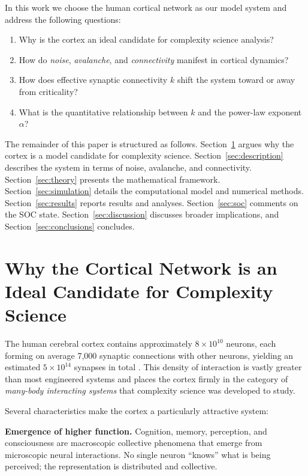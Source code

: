 \documentclass[12pt,a4paper]{article}
\begin{document}
In this work we choose the human cortical network as our model system
and address the following questions:
\begin{enumerate}[noitemsep]
  \item Why is the cortex an ideal candidate for complexity science analysis?
  \item How do \emph{noise}, \emph{avalanche}, and \emph{connectivity}
        manifest in cortical dynamics?
  \item How does effective synaptic connectivity $k$ shift the system
        toward or away from criticality?
  \item What is the quantitative relationship between $k$ and the
        power-law exponent $\alpha$?
\end{enumerate}

The remainder of this paper is structured as follows.
Section~\ref{sec:candidate} argues why the cortex is a model candidate
for complexity science.  Section~\ref{sec:description} describes the
system in terms of noise, avalanche, and connectivity.
Section~\ref{sec:theory} presents the mathematical framework.
Section~\ref{sec:simulation} details the computational model and
numerical methods.  Section~\ref{sec:results} reports results and
analyses.  Section~\ref{sec:soc} comments on the SOC state.
Section~\ref{sec:discussion} discusses broader implications, and
Section~\ref{sec:conclusions} concludes.

\section{Why the Cortical Network is an Ideal Candidate for Complexity Science}
\label{sec:candidate}

The human cerebral cortex contains approximately $8 \times 10^{10}$
neurons, each forming on average 7,000 synaptic connections with other
neurons, yielding an estimated $5 \times 10^{14}$ synapses in total
\cite{azevedo2009}.  This density of interaction is vastly greater
than most engineered systems and places the cortex firmly in the
category of \emph{many-body interacting systems} that complexity
science was developed to study.

Several characteristics make the cortex a particularly attractive
system:

\textbf{Emergence of higher function.}  Cognition, memory, perception,
and consciousness are macroscopic collective phenomena that emerge from
microscopic neural interactions.  No single neuron ``knows'' what is
being perceived; the representation is distributed and collective.
\end{document}
